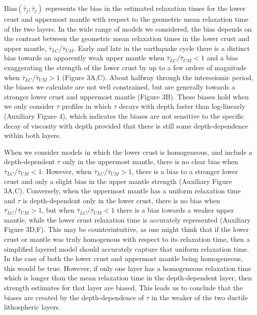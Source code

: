$\mathrm{Bias}(\hat{\tau}_j; \bar{\tau}_j)$ represents the bias in the estimated relaxation times for the lower crust and uppermost mantle with respect to the geometric mean relaxation time of the two layers.  In the wide range of models we considered, the bias depends on the contrast between the geometric mean relaxation times in the lower crust and upper mantle, $\bar{\tau}_{LC} /\bar{\tau}_{UM}$.  Early and late in the earthquake cycle there is a distinct bias towards an apparently weak upper mantle when $\bar{\tau}_{LC} / \bar{\tau}_{UM} < 1$ and a bias exaggerating the strength of the lower crust by up to a few orders of magnitude when $\bar{\tau}_{LC} / \bar{\tau}_{UM} > 1$ (Figure 3A,C).  About halfway through the interseismic period, the biases we calculate are not well constrained, but are generally towards a stronger lower crust and uppermost mantle (Figure 3B). These biases hold when we only consider $\tau$ profiles in which $\tau$ decays with depth faster than log-linearly (Auxiliary Figure 4), which indicates the biases are not sensitive to the specific decay of viscosity with depth provided that there is still some depth-dependence  within both layers.

When we consider models in which the lower crust is homogeneous, and include a depth-dependent $\tau$ only in the uppermost mantle, there is no clear bias when $\bar{\tau}_{LC} / \bar{\tau}_{UM} < 1$.  However, when  $\bar{\tau}_{LC} / \bar{\tau}_{UM} > 1$, there is a bias to a stronger lower crust and only a slight bias in the upper mantle strength (Auxiliary Figure 3A,C).  Conversely, when the uppermost mantle has a uniform relaxation time and $\tau$ is depth-dependent only in the lower crust, there is no bias when $\bar{\tau}_{LC} / \bar{\tau}_{UM} > 1$, but when $\bar{\tau}_{LC} / \bar{\tau}_{UM} < 1$ there is a bias towards a weaker upper mantle, while the lower crust relaxation time is accurately represented (Auxiliary Figure 3D,F). This may be counterintuitive, as one might think that if the lower crust or mantle was truly homogenous with respect to its relaxation time, then a simplified layered model should accurately capture that uniform relaxation time. In the case of both the lower crust and uppermost mantle being homogeneous, this would be true. However, if only one layer has a homogeneous relaxation time which is longer than the mean relaxation time in the depth-dependent layer, then strength estimates for that layer are biased.  This leads us to conclude that the biases are created by the depth-dependence of $\tau$ in the weaker of the two ductile lithospheric layers.

